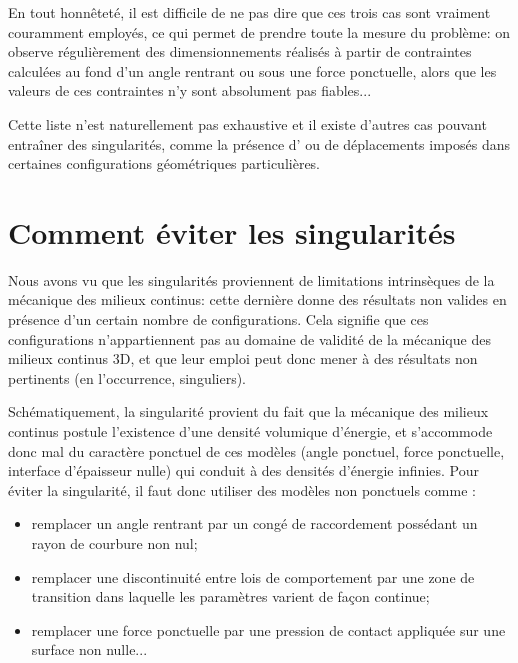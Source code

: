 \medskip
En tout honnêteté, il est difficile de ne pas dire que ces trois cas sont vraiment couramment 
employés, ce qui permet de prendre toute la mesure du problème: on observe régulièrement des
dimensionnements réalisés à partir de contraintes calculées au fond d'un angle rentrant ou sous
une force ponctuelle, alors que les valeurs de ces contraintes n'y sont absolument pas fiables...

Cette liste n'est naturellement pas exhaustive et il existe d'autres cas pouvant entraîner des
singularités, comme la présence d' ou de déplacements imposés 
dans certaines configurations géométriques particulières. 


\medskip
\section{Comment éviter les singularités}

Nous avons vu que les singularités proviennent de limitations intrinsèques de la mécanique des
milieux continus: cette dernière donne des résultats non valides en présence d'un certain
nombre de configurations. Cela signifie que ces configurations n'appartiennent
pas au domaine de validité de la mécanique des milieux continus 3D, et que leur emploi peut
donc mener à des résultats non pertinents (en l'occurrence, singuliers).

\medskip
Schématiquement, la singularité provient du fait que la mécanique des milieux continus postule
l'existence d'une densité volumique d'énergie, et s'accommode donc mal du caractère
\og ponctuel\fg{} de ces modèles (angle ponctuel, force ponctuelle, interface d'épaisseur nulle) qui
conduit à des densités d'énergie infinies. Pour éviter la singularité, il faut donc utiliser des
modèles non ponctuels comme :
\begin{itemize}
   \item remplacer un angle rentrant par un congé de raccordement possédant un rayon de courbure
	non nul;
   \item remplacer une discontinuité entre lois de comportement par une zone de transition dans
	laquelle les paramètres varient de façon continue;
   \item remplacer une force ponctuelle par une pression de contact appliquée sur une surface non
	nulle...
\end{itemize}

